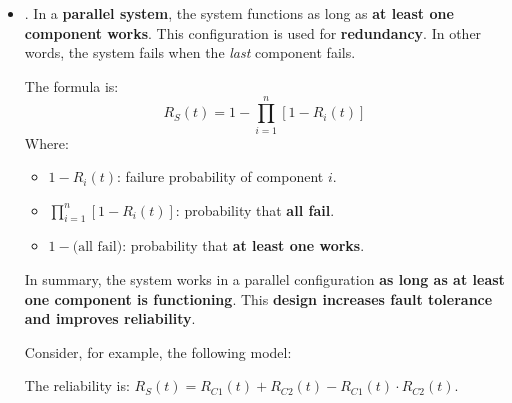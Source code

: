 \begin{itemize}
    \item {}. In a \textbf{parallel system}, the system functions as long as \textbf{at least one component works}. This configuration is used for \textbf{redundancy}. In other words, the system fails when the \emph{last} component fails.

    The formula is:
    \begin{equation}
        R_S(t) = 1 - \displaystyle\prod_{i=1}^{n} \left[1 - R_i(t)\right]
    \end{equation}
    Where:
    \begin{itemize}[label=*]
        \item $1 - R_i(t)$: failure probability of component $i$.
        \item $\displaystyle\prod_{i=1}^{n} \left[1 - R_i(t)\right]$: probability that \textbf{all fail}.
        \item $1 - \text{(all fail)}$: probability that \textbf{at least one works}.
    \end{itemize}
    In summary, the system works in a parallel configuration \textbf{as long as at least one component is functioning}. This \textbf{design increases fault tolerance and improves reliability}.

    \begin{examplebox}
        Consider, for example, the following model:
        \begin{center}
        \end{center}
        The reliability is: $R_S(t) = R_{C1}(t) + R_{C2}(t) - R_{C1}(t) \cdot R_{C2}(t)$.
    \end{examplebox}
\end{itemize}

